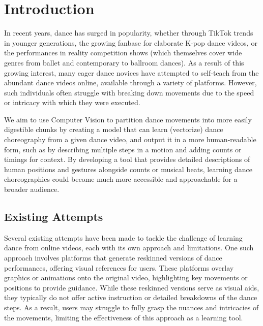 \section{Introduction}
\label{sec:intro}

In recent years, dance has surged in popularity, whether through TikTok trends in younger 
generations, the growing fanbase for elaborate K-pop dance videos, or the performances in 
reality competition shows (which themselves cover wide genres from ballet and contemporary 
to ballroom dances). As a result of this growing interest, many eager dance novices have 
attempted to self-teach from the abundant dance videos online, available through a variety 
of platforms. However, such individuals often struggle with breaking down movements due to 
the speed or intricacy with which they were executed.

We aim to use Computer Vision to partition dance movements into more easily digestible chunks 
by creating a model that can learn (vectorize) dance choreography from a given dance video, and 
output it in a more human-readable form, such as by describing multiple steps in a motion and 
adding counts or timings for context. By developing a tool that provides detailed descriptions 
of human positions and gestures alongside counts or musical beats, learning dance choreographies 
could become much more accessible and approachable for a broader audience.

\subsection{Existing Attempts}
Several existing attempts have been made to tackle the challenge of learning dance from online 
videos, each with its own approach and limitations. One such approach involves platforms that 
generate reskinned versions of dance performances, offering visual references for users. These 
platforms overlay graphics or animations onto the original video, highlighting key movements or 
positions to provide guidance. While these reskinned versions serve as visual aids, they 
typically do not offer active instruction or detailed breakdowns of the dance steps. As a result, 
users may struggle to fully grasp the nuances and intricacies of the movements, limiting the 
effectiveness of this approach as a learning tool.

